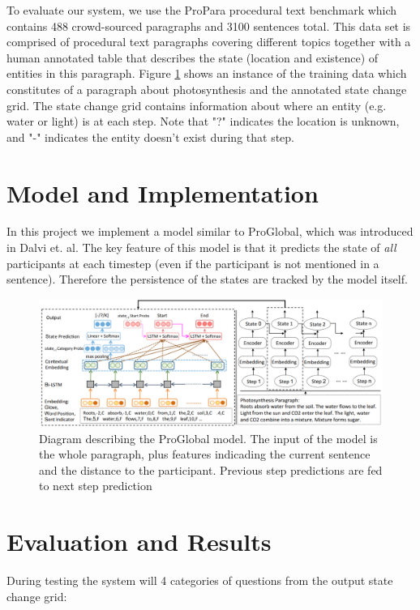 \documentclass[11pt,a4paper]{article}
\begin{document}
To evaluate our system, we use the ProPara procedural text benchmark 
which contains 488 crowd-sourced paragraphs and 3100 sentences total. 
This data set is comprised of procedural text paragraphs covering different 
topics together with a human annotated table that describes the state 
(location and existence) of entities in this paragraph. Figure 
\ref{fig:participant-grid} shows an instance of the training data which 
constitutes of a paragraph about photosynthesis and the annotated state 
change grid. The state change grid contains information about where an 
entity (e.g. water or light) is at each step. Note that "?" indicates the 
location is unknown, and "-" indicates the entity doesn't exist during that step.

\section{Model and Implementation}

In this project we implement a model similar to ProGlobal, which was 
introduced in Dalvi et. al. The key feature of this model is that it predicts 
the state of \textit{all} participants at each timestep (even if the participant is 
not mentioned in a sentence). Therefore the persistence of the states are 
tracked by the model itself. 

\begin{figure}[h]
\includegraphics[width=16cm]{proglobal.PNG}
\caption{Diagram describing the ProGlobal model. The input of the model is the whole paragraph, plus features indicading the current sentence and the distance to the participant. Previous step predictions are fed to next step prediction}
\label{fig:participant-grid}
\end{figure}

\section{Evaluation and Results}

During testing the system will 4 categories of questions from the output 
state change grid: 
\end{document}
